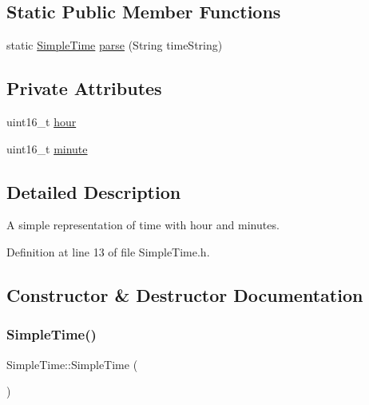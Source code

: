 \subsection*{Static Public Member Functions}
\begin{DoxyCompactItemize}
\item 
static \mbox{\hyperlink{class_simple_time}{Simple\+Time}} \mbox{\hyperlink{class_simple_time_ad2d133f20de1ac63166308bc77906dfb}{parse}} (String time\+String)
\end{DoxyCompactItemize}
\subsection*{Private Attributes}
\begin{DoxyCompactItemize}
\item 
uint16\+\_\+t \mbox{\hyperlink{class_simple_time_a3818c7ef3b2f7d685e403f6bbf993bdc}{hour}}
\item 
uint16\+\_\+t \mbox{\hyperlink{class_simple_time_ad8cfa601eddca64717e27a8ec95cddfa}{minute}}
\end{DoxyCompactItemize}


\subsection{Detailed Description}
A simple representation of time with hour and minutes. 

Definition at line 13 of file Simple\+Time.\+h.



\subsection{Constructor \& Destructor Documentation}
\mbox{\label{class_simple_time_adbc19913746c729324ba93d1efd82a0d}} 
\subsubsection{\texorpdfstring{SimpleTime()}{SimpleTime()}\hspace{0.1cm}{\footnotesize\ttfamily [1/4]}}
{\footnotesize\ttfamily Simple\+Time\+::\+Simple\+Time (\begin{DoxyParamCaption}{ }\end{DoxyParamCaption})\hspace{0.3cm}{\ttfamily [inline]}}



